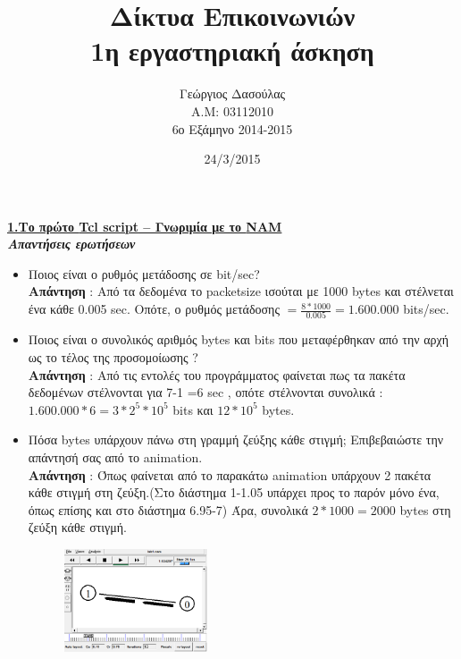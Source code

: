 \documentclass{article}%
\begin{document}

\title{Δίκτυα Επικοινωνιών\\1η εργαστηριακή άσκηση}
\author{Γεώργιος Δασούλας\\Α.Μ: 03112010 \\ 6ο Εξάμηνο 2014-2015  }
\date{24/3/2015}
\maketitle

\textbf{{\underline{1.Το πρώτο \textlatin{Tcl script}
 – Γνωριμία με το \textlatin{NAM} }}}  \\

\textsl{\textbf{Απαντήσεις ερωτήσεων}}
\begin{itemize}
	\item Ποιος είναι ο ρυθμός μετάδοσης σε \textlatin{bit/sec?}\\
	\textbf{Απάντηση} : Από τα δεδομένα το \textlatin{packetsize} ισούται με 1000 \textlatin{bytes} και στέλνεται ένα κάθε 0.005 \textlatin{sec}. Οπότε, ο ρυθμός μετάδοσης $ = \frac{8*1000}{0.005}=1.600.000 $ \textlatin{bits/sec}.
	\item Ποιος είναι ο συνολικός αριθμός \textlatin{bytes} και \textlatin{bits} που μεταφέρθηκαν από την αρχή ως το τέλος της προσομοίωσης \textlatin{?}\\
	\textbf{Απάντηση} : Από τις εντολές του προγράμματος φαίνεται πως τα πακέτα δεδομένων στέλνονται για 7-1 =6  \textlatin{sec} , οπότε στέλνονται συνολικά : $1.600.000*6=3*2^5*10^5$ \textlatin{bits} και $12 * 10^5$ \textlatin {bytes}.
	\item Πόσα \textlatin{bytes} υπάρχουν πάνω στη γραμμή ζεύξης κάθε στιγμή; Επιβεβαιώστε την απάντησή σας από
το \textlatin{animation}.\\
\textbf{Απάντηση} : Όπως φαίνεται από το παρακάτω \textlatin{animation} υπάρχουν 2 πακέτα κάθε στιγμή στη ζεύξη.(Στο διάστημα 1-1.05 υπάρχει προς το παρόν μόνο ένα, όπως επίσης και στο διάστημα 6.95-7) Άρα, συνολικά $2*1000=2000$ \textlatin{bytes} στη ζεύξη κάθε στιγμή.
\begin{figure}[htbp]
	\centering
		\includegraphics[width=0.40\textwidth]{1.png}

\end{figure}
\end{itemize}
\end{document}

